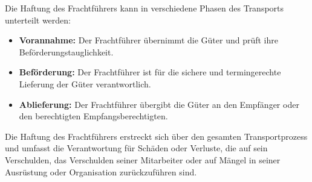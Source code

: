 Die Haftung des Frachtführers kann in verschiedene Phasen des Transports unterteilt werden:

\begin{itemize}
    \item \textbf{Vorannahme:} Der Frachtführer übernimmt die Güter und prüft ihre Beförderungstauglichkeit.
    \item \textbf{Beförderung:} Der Frachtführer ist für die sichere und termingerechte Lieferung der Güter verantwortlich.
    \item \textbf{Ablieferung:} Der Frachtführer übergibt die Güter an den Empfänger oder den berechtigten Empfangsberechtigten.
\end{itemize}

Die Haftung des Frachtführers erstreckt sich über den gesamten Transportprozess und umfasst die Verantwortung für Schäden oder Verluste, die auf sein Verschulden, das Verschulden seiner Mitarbeiter oder auf Mängel in seiner Ausrüstung oder Organisation zurückzuführen sind.

